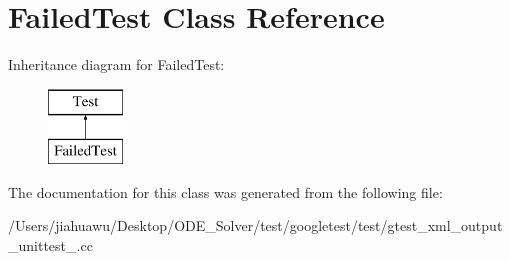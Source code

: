 \hypertarget{class_failed_test}{}\section{Failed\+Test Class Reference}
\label{class_failed_test}
Inheritance diagram for Failed\+Test\+:\begin{figure}[H]
\begin{center}
\leavevmode
\includegraphics[height=2.000000cm]{class_failed_test}
\end{center}
\end{figure}


The documentation for this class was generated from the following file\+:\begin{DoxyCompactItemize}
\item 
/\+Users/jiahuawu/\+Desktop/\+O\+D\+E\+\_\+\+Solver/test/googletest/test/gtest\+\_\+xml\+\_\+output\+\_\+unittest\+\_\+.\+cc\end{DoxyCompactItemize}

